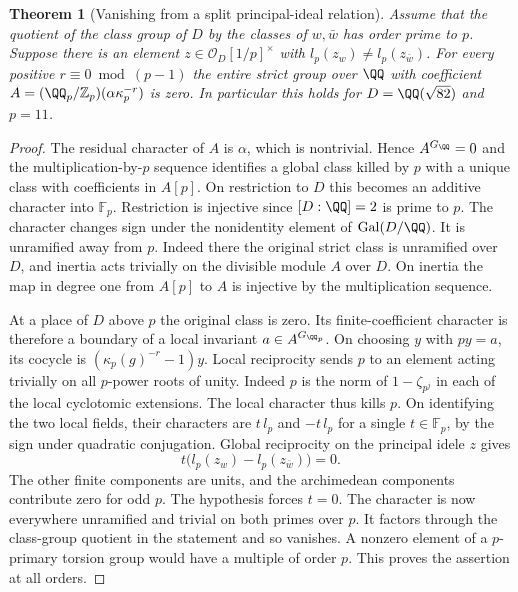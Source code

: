 \documentclass[a4paper,11pt]{article}
\newtheorem{theorem}[proposition]{Theorem}
\theoremstyle{definition}
\theoremstyle{remark}
\newcommand{\ZZ}{\mathbb Z}\newcommand{\ord}{\operatorname{ord}}
\numberwithin{equation}{section}
\newcommand{\OO}{\mathcal O}
\begin{document}
\begin{theorem}[Vanishing from a split principal-ideal relation]\leavevmode
\label{thm:splitunits317}
Assume that the quotient of the class group of \(D\) by the
classes of \(w,\bar w\) has order prime to \(p\). Suppose
there is an element \(z\in\OO_D[1/p]^\times\) with
\(l_p(z_w)\ne l_p(z_{\bar w})\).
For every positive \(r\equiv0\bmod(p-1)\) the entire strict
group over \(\QQ\) with coefficient
\(A=(\QQ_p/\ZZ_p)(\alpha\kappa_p^{-r})\) is zero.
In particular this holds for \(D=\QQ(\sqrt{82})\) and \(p=11\).
\end{theorem}
\begin{proof}
The residual character of \(A\) is \(\alpha\), which is
nontrivial. Hence \(A^{G_\QQ}=0\) and the multiplication-by-\(p\)
sequence identifies a global class killed by \(p\) with a
unique class with coefficients in \(A[p]\). On restriction
to \(D\) this becomes an additive character into \(\mathbb F_p\).
Restriction is injective since \([D:\QQ]=2\) is prime to \(p\).
The character changes sign under the nonidentity element of
\(\operatorname{Gal}(D/\QQ)\). It is unramified away from \(p\).
Indeed there the original strict class is unramified over \(D\),
and inertia acts trivially on the divisible module \(A\) over
\(D\). On inertia the map in degree one from \(A[p]\) to \(A\)
is injective by the multiplication sequence.

At a place of \(D\) above \(p\) the original class is zero.
Its finite-coefficient character is therefore a boundary of
a local invariant \(a\in A^{G_{\QQ_p}}\). On choosing \(y\)
with \(py=a\), its cocycle is
\((\kappa_p(g)^{-r}-1)y\). Local reciprocity sends \(p\)
to an element acting trivially on all \(p\)-power roots of
unity. Indeed \(p\) is the norm of \(1-\zeta_{p^j}\) in
each of the local cyclotomic extensions. The local character
thus kills \(p\). On identifying the two local fields, their
characters are \(t\,l_p\) and \(-t\,l_p\) for a single
\(t\in\mathbb F_p\), by the sign under quadratic conjugation.
Global reciprocity on the principal idele \(z\) gives
\[
           t\big(l_p(z_w)-l_p(z_{\bar w})\big)=0 .
\]
The other finite components are units, and the archimedean
components contribute zero for odd \(p\). The hypothesis
forces \(t=0\). The character is now everywhere unramified
and trivial on both primes over \(p\). It factors through
the class-group quotient in the statement and so vanishes.
A nonzero element of a \(p\)-primary torsion group would have
a multiple of order \(p\). This proves the assertion at all orders.


\end{proof}
\end{document}
